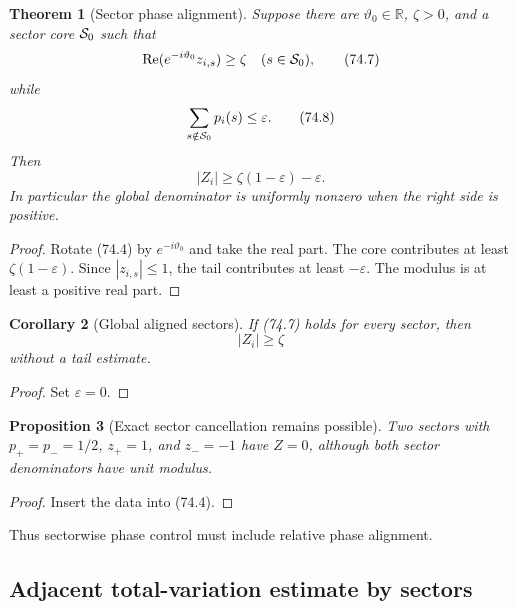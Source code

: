 \documentclass[11pt]{article}
\newtheorem{theorem}{Theorem}[section]
\newtheorem{proposition}[theorem]{Proposition}
\newtheorem{corollary}[theorem]{Corollary}
\begin{document}
\begin{theorem}[Sector phase alignment]
\label{thm:v11v74-alignment}
Suppose there are \(\vartheta_0\in\mathbb R\), \(\zeta>0\), and a
sector core \({\cal S}_0\) such that
\[
             \operatorname{Re}(e^{-i\vartheta_0}z_{i,s})
                              \ge\zeta
                   \quad(s\in{\cal S}_0),                    \tag{74.7}
\]
while
\[
                              \sum_{s\notin{\cal S}_0}p_i(s)
                                   \le\varepsilon.             \tag{74.8}
\]
Then
\[
                              |Z_i|
             \ge\zeta(1-\varepsilon)-\varepsilon.             \tag{74.9}
\]
In particular the global denominator is uniformly nonzero when the
right side is positive.
\end{theorem}

\begin{proof}
Rotate (74.4) by \(e^{-i\vartheta_0}\) and take the real part.
The core contributes at least \(\zeta(1-\varepsilon)\).  Since
\(|z_{i,s}|\le1\), the tail contributes at least
\(-\varepsilon\).  The modulus is at least a positive real part.
\end{proof}

\begin{corollary}[Global aligned sectors]
\label{cor:v11v74-all}
If (74.7) holds for every sector, then
\[
                              |Z_i|\ge\zeta                   \tag{74.10}
\]
without a tail estimate.
\end{corollary}

\begin{proof}
Set \(\varepsilon=0\).
\end{proof}

\begin{proposition}[Exact sector cancellation remains possible]
\label{prop:v11v74-cancel}
Two sectors with \(p_+=p_-=1/2\), \(z_+=1\), and \(z_-=-1\) have
\(Z=0\), although both sector denominators have unit modulus.
\end{proposition}

\begin{proof}
Insert the data into (74.4).
\end{proof}

Thus sectorwise phase control must include relative phase alignment.

\subsection{Adjacent total-variation estimate by sectors}
\end{document}

